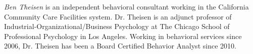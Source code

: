 \textit{Ben Theisen} is an independent behavioral consultant working in the California Community Care Facilities system. Dr. Theisen is an adjunct professor of Industrial-Organizational/Business Psychology at The Chicago School of Professional Psychology in Los Angeles. Working in behavioral services since 2006, Dr. Theisen has been a Board Certified Behavior Analyst since 2010. 
\clearpage
